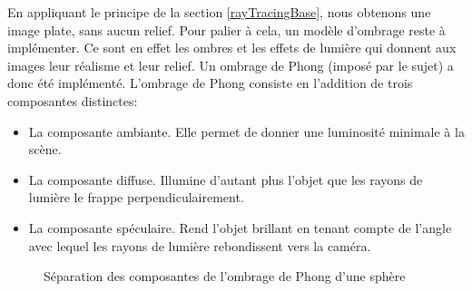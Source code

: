 \documentclass[../../Rapport RayTracer.tex]{subfiles}
\begin{document}
En appliquant le principe de la section \ref{rayTracingBase}, nous obtenons une image plate, sans aucun relief. Pour palier à cela, un modèle d'ombrage reste à implémenter. Ce sont en effet les ombres et les effets de lumière qui donnent aux images leur réalisme et leur relief. Un ombrage de Phong (imposé par le sujet) a donc été implémenté. L'ombrage de Phong consiste en l'addition de trois composantes distinctes:
\begin{itemize}
	\item {La composante ambiante. Elle permet de donner une luminosité minimale à la scène.}
	\item {La composante diffuse. Illumine d'autant plus l'objet que les rayons de lumière le frappe perpendiculairement.}
	\item {La composante spéculaire. Rend l'objet brillant en tenant compte de l'angle avec lequel les rayons de lumière rebondissent vers la caméra.}
\end{itemize}

\begin{figure}[h!]

	\caption{Séparation des composantes de l'ombrage de Phong d'une sphère}
	\label{finalPhong}
\end{figure}
\FloatBarrier
\end{document}
